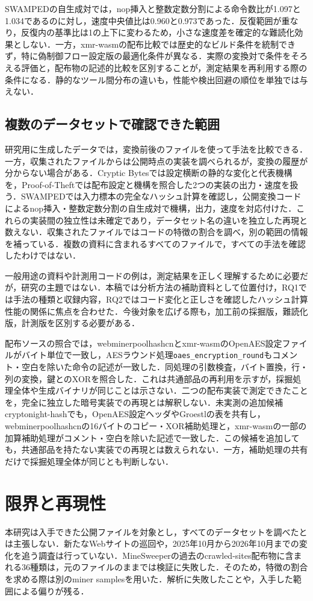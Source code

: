 \documentclass[submit,techrep]{ipsj}
\begin{document}
SWAMPEDの自生成対では，nop挿入と整数定数分割による命令数比が1.097と1.034であるのに対し，速度中央値比は0.960と0.973であった．反復範囲が重なり，反復内の基準比は1の上下に変わるため，小さな速度差を確定的な難読化効果としない．一方，xmr-wasmの配布比較では歴史的なビルド条件を統制できず，特に偽制御フロー設定版の最適化条件が異なる．実際の変換対で条件をそろえる評価と，配布物の記述的比較を区別することが，測定結果を再利用する際の条件になる．静的なツール間分布の違いも，性能や検出回避の順位を単独では与えない．

\subsection{複数のデータセットで確認できた範囲}
研究用に生成したデータでは，変換前後のファイルを使って手法を比較できる．一方，収集されたファイルからは公開時点の実装を調べられるが，変換の履歴が分からない場合がある．Cryptic Bytesでは設定横断の静的な変化と代表機構を，Proof-of-Theftでは配布設定と機構を照合した2つの実装の出力・速度を扱う．SWAMPEDでは入力標本の完全なハッシュ計算を確認し，公開変換コードによるnop挿入・整数定数分割の自生成対で機構，出力，速度を対応付けた．これらの実装間の独立性は未確定であり，データセット名の違いを独立した再現と数えない．収集されたファイルではコードの特徴の割合を調べ，別の範囲の情報を補っている．複数の資料に含まれるすべてのファイルで，すべての手法を確認したわけではない．

一般用途の資料や計測用コードの例は，測定結果を正しく理解するために必要だが，研究の主題ではない．本稿では分析方法の補助資料として位置付け，RQ1では手法の種類と収録内容，RQ2ではコード変化と正しさを確認したハッシュ計算性能の関係に焦点を合わせた．今後対象を広げる際も，加工前の採掘版，難読化版，計測版を区別する必要がある．

配布ソースの照合では，webminerpoolhashcnとxmr-wasmのOpenAES設定ファイルがバイト単位で一致し，AESラウンド処理\texttt{oaes\_encryption\_round}もコメント・空白を除いた命令の記述が一致した．同処理の引数検査，バイト置換，行・列の変換，鍵とのXORを照合した．これは共通部品の再利用を示すが，採掘処理全体や生成バイナリが同じことは示さない．二つの配布実装で測定できたことを，完全に独立した暗号実装での再現とは解釈しない．未実測の追加候補cryptonight-hashでも，OpenAES設定ヘッダやGroestlの表を共有し，webminerpoolhashcnの16バイトのコピー・XOR補助処理と，xmr-wasmの一部の加算補助処理がコメント・空白を除いた記述で一致した．この候補を追加しても，共通部品を持たない実装での再現とは数えられない．一方，補助処理の共有だけで採掘処理全体が同じとも判断しない．

\section{限界と再現性}
本研究は入手できた公開ファイルを対象とし，すべてのデータセットを調べたとは主張しない．新たなWebサイトの巡回や，2025年10月から2026年10月までの変化を追う調査は行っていない．MineSweeperの過去のcrawled-sites配布物に含まれる36種類は，元のファイルのままでは検証に失敗した．そのため，特徴の割合を求める際は別のminer samplesを用いた．解析に失敗したことや，入手した範囲による偏りが残る．
\end{document}
